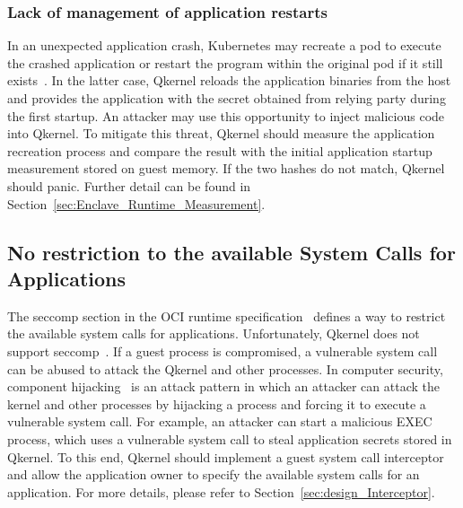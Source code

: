 \subsubsection{Lack of management of application restarts}
In an unexpected application crash, Kubernetes may recreate a pod to execute the crashed application or restart the program within the original pod if it still exists~\cite*{k8s}. In the latter case, Qkernel reloads the application binaries from the host and provides the application with the secret 
obtained from relying party during the first startup. An attacker may use this opportunity to inject malicious code into Qkernel. To mitigate this threat, Qkernel should measure the application recreation process and compare the result with the initial 
application startup measurement stored on guest memory. If the two hashes do not match, Qkernel should panic.  Further detail can be found in Section~\ref{sec:Enclave_Runtime_Measurement}. 

\subsection{No restriction to the available System Calls for Applications}
The seccomp section in the OCI runtime specification~\cite*{oci-runtime-spec} defines a way to restrict the available system calls for applications. Unfortunately, Qkernel does not support seccomp~\cite*{seccomp}. If a guest process is compromised, a vulnerable system call can be abused to attack the Qkernel and other processes. 
In computer security, component hijacking~\cite*{DBLP:journals/corr/WuGLD16} is an attack pattern in which an attacker can attack the kernel and other processes by hijacking a process and forcing it to execute a vulnerable system call. For example, an attacker can start a malicious EXEC process, which uses a vulnerable system 
call to steal application secrets stored in Qkernel. To this end, Qkernel should implement a guest system call interceptor and allow the application owner to specify the available system calls for an application. For more details, please refer to Section~\ref{sec:design_Interceptor}. 

